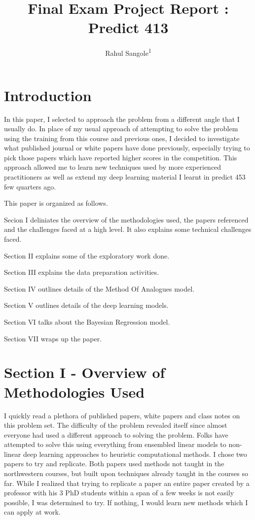 \documentclass[floatsintext,man]{apa6}
\title{Final Exam Project Report : Predict 413}
\author{Rahul Sangole\textsuperscript{1}}
\affiliation{
    \vspace{0.5cm}
          \textsuperscript{1} Northwestern University  }
\theoremstyle{definition}
\theoremstyle{definition}
\theoremstyle{definition}
\theoremstyle{remark}
\begin{document}
\maketitle

\setcounter{secnumdepth}{0}



\section{Introduction}\label{introduction}

In this paper, I selected to approach the problem from a different angle
that I usually do. In place of my usual approach of attempting to solve
the problem using the training from this course and previous ones, I
decided to investigate what published journal or white papers have done
previously, especially trying to pick those papers which have reported
higher scores in the competition. This approach allowed me to learn new
techniques used by more experienced practitioners as well as extend my
deep learning material I learnt in predict 453 few quarters ago.

This paper is organized as follows.

Secion I deliniates the overview of the methodologies used, the papers
referenced and the challenges faced at a high level. It also explains
some technical challenges faced.

Section II explains some of the exploratory work done.

Section III explains the data preparation activities.

Section IV outlines details of the Method Of Analogues model.

Section V outlines details of the deep learning models.

Section VI talks about the Bayesian Regression model.

Section VII wraps up the paper.

\section{Section I - Overview of Methodologies
Used}\label{section-i---overview-of-methodologies-used}

I quickly read a plethora of published papers, white papers and class
notes on this problem set. The difficulty of the problem revealed itself
since almost everyone had used a different approach to solving the
problem. Folks have attempted to solve this using everything from
ensembled linear models to non-linear deep learning approaches to
heuristic computational methods. I chose two papers to try and
replicate. Both papers used methods not taught in the northwestern
courses, but built upon techniques already taught in the courses so far.
While I realized that trying to replicate a paper an entire paper
created by a professor with his 3 PhD students within a span of a few
weeks is not easily possible, I was determined to try. If nothing, I
would learn new methods which I can apply at work.
\end{document}

